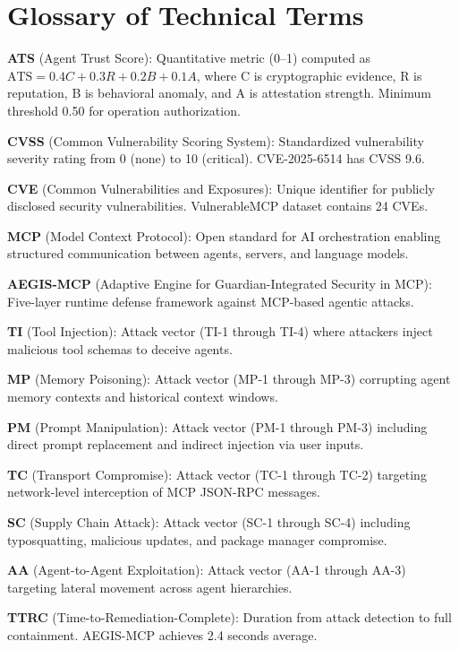 \section*{Glossary of Technical Terms}
\label{sec:glossary}

\noindent\textbf{ATS} (Agent Trust Score): Quantitative metric (0--1) computed as $\mathrm{ATS} = 0.4C + 0.3R + 0.2B + 0.1A$, where C is cryptographic evidence, R is reputation, B is behavioral anomaly, and A is attestation strength. Minimum threshold 0.50 for operation authorization.

\noindent\textbf{CVSS} (Common Vulnerability Scoring System): Standardized vulnerability severity rating from 0 (none) to 10 (critical). CVE-2025-6514 has CVSS 9.6.

\noindent\textbf{CVE} (Common Vulnerabilities and Exposures): Unique identifier for publicly disclosed security vulnerabilities. VulnerableMCP dataset contains 24 CVEs.

\noindent\textbf{MCP} (Model Context Protocol): Open standard for AI orchestration enabling structured communication between agents, servers, and language models.

\noindent\textbf{AEGIS-MCP} (Adaptive Engine for Guardian-Integrated Security in MCP): Five-layer runtime defense framework against MCP-based agentic attacks.

\noindent\textbf{TI} (Tool Injection): Attack vector (TI-1 through TI-4) where attackers inject malicious tool schemas to deceive agents.

\noindent\textbf{MP} (Memory Poisoning): Attack vector (MP-1 through MP-3) corrupting agent memory contexts and historical context windows.

\noindent\textbf{PM} (Prompt Manipulation): Attack vector (PM-1 through PM-3) including direct prompt replacement and indirect injection via user inputs.

\noindent\textbf{TC} (Transport Compromise): Attack vector (TC-1 through TC-2) targeting network-level interception of MCP JSON-RPC messages.

\noindent\textbf{SC} (Supply Chain Attack): Attack vector (SC-1 through SC-4) including typosquatting, malicious updates, and package manager compromise.

\noindent\textbf{AA} (Agent-to-Agent Exploitation): Attack vector (AA-1 through AA-3) targeting lateral movement across agent hierarchies.

\noindent\textbf{TTRC} (Time-to-Remediation-Complete): Duration from attack detection to full containment. AEGIS-MCP achieves 2.4 seconds average.

